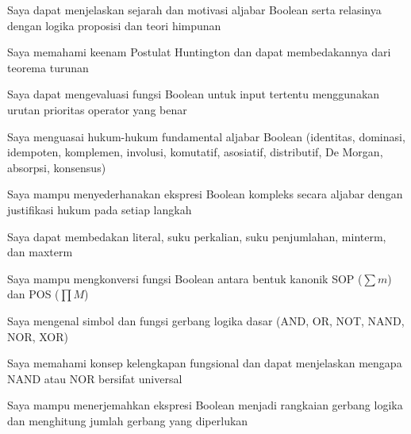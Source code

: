 \documentclass[../main]{subfiles}
\begin{document}
\begin{checklist}
  \item Saya dapat menjelaskan sejarah dan motivasi aljabar Boolean serta relasinya dengan logika proposisi dan teori himpunan
  \item Saya memahami keenam Postulat Huntington dan dapat membedakannya dari teorema turunan
  \item Saya dapat mengevaluasi fungsi Boolean untuk input tertentu menggunakan urutan prioritas operator yang benar
  \item Saya menguasai hukum-hukum fundamental aljabar Boolean (identitas, dominasi, idempoten, komplemen, involusi, komutatif, asosiatif, distributif, De Morgan, absorpsi, konsensus)
  \item Saya mampu menyederhanakan ekspresi Boolean kompleks secara aljabar dengan justifikasi hukum pada setiap langkah
  \item Saya dapat membedakan literal, suku perkalian, suku penjumlahan, minterm, dan maxterm
  \item Saya mampu mengkonversi fungsi Boolean antara bentuk kanonik SOP ($\sum m$) dan POS ($\prod M$)
  \item Saya mengenal simbol dan fungsi gerbang logika dasar (AND, OR, NOT, NAND, NOR, XOR)
  \item Saya memahami konsep kelengkapan fungsional dan dapat menjelaskan mengapa NAND atau NOR bersifat universal
  \item Saya mampu menerjemahkan ekspresi Boolean menjadi rangkaian gerbang logika dan menghitung jumlah gerbang yang diperlukan
\end{checklist}

\end{document}
